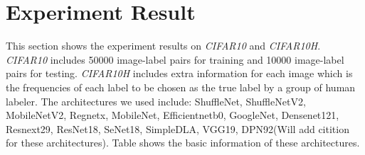 \documentclass{article}
\begin{document}
\section{Experiment Result}
This section shows the experiment results on \textit{CIFAR10}\cite{cifar10} and \textit{CIFAR10H}\cite{cifar10h}. \textit{CIFAR10} includes 50000 image-label pairs for training and 10000 image-label pairs for testing. \textit{CIFAR10H} includes extra information for each image which is the frequencies of each label to be chosen as the true label by a group of human labeler. The architectures we used include: ShuffleNet, ShuffleNetV2, MobileNetV2, Regnetx, MobileNet, Efficientnetb0, GoogleNet, Densenet121, Resnext29, ResNet18, SeNet18, SimpleDLA, VGG19, DPN92(Will add citition for these architectures). Table\cite{table:arc_basic} shows the basic information of these architectures.
\end{document}
